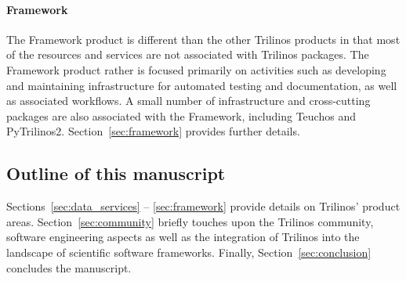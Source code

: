 \paragraph{Framework} The Framework product is different than the other Trilinos products in that most of the resources and services are not associated with Trilinos packages. The Framework product rather is focused primarily on activities such as developing and maintaining infrastructure for automated testing and documentation, as well as associated workflows. A small number of infrastructure and cross-cutting packages are also associated with the Framework, including Teuchos and PyTrilinos2. Section~\ref{sec:framework} provides further details.

\subsection{Outline of this manuscript}

Sections~\ref{sec:data_services} -- \ref{sec:framework} provide details on Trilinos' product areas.
Section~\ref{sec:community} briefly touches upon the Trilinos community, software engineering aspects as well as the integration of Trilinos into the landscape of scientific software frameworks.
Finally, Section~\ref{sec:conclusion} concludes the manuscript.
